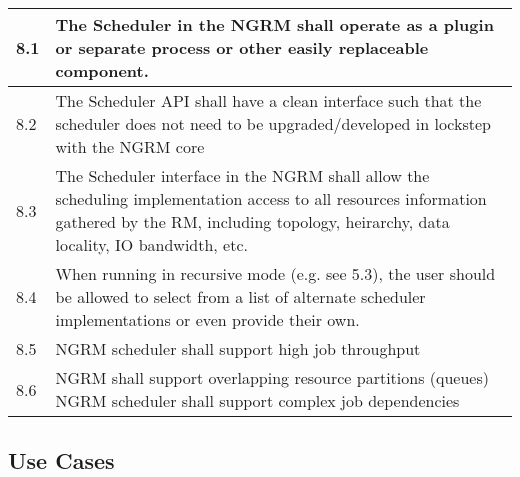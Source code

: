 \begin{longtable}{|p{1cm}|p{15cm}|}
  \hline
  8.1 & The Scheduler in the NGRM shall operate as a plugin or separate
	process or other easily replaceable component.\\
  \hline
  8.2 & The Scheduler API shall have a clean interface such that the
	scheduler does not need to be upgraded/developed in lockstep with
	the NGRM core\\
  \hline
  8.3 & The Scheduler interface in the NGRM shall allow the scheduling
	implementation access to all resources information gathered by
	the RM, including topology, heirarchy, data locality, IO bandwidth,
	etc.\\
  \hline
  8.4 & When running in recursive mode (e.g. see 5.3), the user should be
	allowed to select from a list of alternate scheduler implementations
	or even provide their own.\\
  \hline
  8.5 & NGRM scheduler shall support high job throughput\\
  \hline
  8.6 & NGRM shall support overlapping resource partitions (queues)
 	NGRM scheduler shall support complex job dependencies\\
  \hline
\end{longtable}

\subsection{Use Cases}\label{ReqsUseCases}

